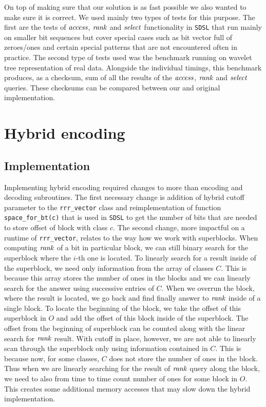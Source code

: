 On top of making sure that our solution is as fast possible we also wanted to make sure it is
correct. We used mainly two types of tests for this purpose. The first are the tests of $\mathit{access}$,
$\mathit{rank}$ and $\mathit{select}$ functionality in \texttt{SDSL} that run mainly on smaller bit sequences
but cover special cases such as bit vector full of zeroes/ones and certain special patterns
that are not encountered often in practice. The second type of tests used was the benchmark
running on wavelet tree representation of real data. Alongside the individual timings, this
benchmark produces, as a checksum, sum of all the results of the $\mathit{access}$, $\mathit{rank}$ and $\mathit{select}$
queries. These checksums can be compared between our and original implementation.

\section{Hybrid encoding}


\subsection{Implementation}

Implementing hybrid encoding required changes to more than encoding and decoding
subroutines. The first necessary change is addition of hybrid cutoff parameter
to the \texttt{rrr\_vector} class and reimplementation of function \texttt{space\_for\_bt(c)}
that is used in \texttt{SDSL} to get the number of bits that are needed to store offset
of block with class $c$. The second change, more impactful on a runtime
of \texttt{rrr\_vector}, relates to the way how we work with superblocks. When
computing $\mathit{rank}$ of a bit in particular block, we can still binary search for
the superblock where the $i$-th one is located. To linearly search for a result
inside of the superblock, we need only information from the array of classes $C$.
This is because this array stores the number of ones in the blocks and we can linearly
search for the answer using successive entries of $C$. When we overrun the block, where
the result is located, we go back and find finally answer to $\mathit{rank}$ inside of a
single block. To locate the beginning of the block, we take the offset of this superblock
in $O$ and add the offset of this block inside of the superblock. The offset from the
beginning of superblock can be counted along with the linear search for $\mathit{rank}$ result.
With cutoff in place, however, we are not able to linearly scan through the superblock
only using information contained in $C$. This is because now, for some classes, $C$ does
not store the number of ones in the block. Thus when we are linearly searching for the result
of $\mathit{rank}$ query along the block, we need to also from time to time count number of ones
for some block in $O$. This creates some additional memory accesses that may slow down the
hybrid implementation.

